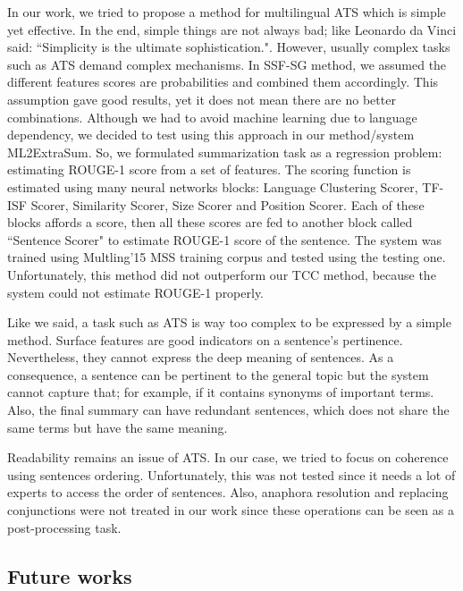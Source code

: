 \documentclass[12pt, oneside, a4paper]{article}
\begin{document}
In our work, we tried to propose a method for multilingual ATS which is simple yet effective.
In the end, simple things are not always bad;  like Leonardo da Vinci said: ``Simplicity is the ultimate sophistication.".
However, usually complex tasks such as ATS demand complex mechanisms. 
In SSF-SG method, we assumed the different features scores are probabilities and combined them accordingly.
This assumption gave good results, yet it does not mean there are no better combinations. 
Although we had to avoid machine learning due to language dependency, we decided to test using this approach in our method/system ML2ExtraSum. 
So, we formulated summarization task as a regression problem: estimating ROUGE-1 score from a set of features. 
The scoring function is estimated using many neural networks blocks: Language Clustering Scorer, TF-ISF Scorer, Similarity Scorer, Size Scorer and Position Scorer. 
Each of these blocks affords a score, then all these scores are fed to another block called ``Sentence Scorer" to estimate ROUGE-1 score of the sentence.
The system was trained using Multling'15 MSS training corpus and tested using the testing one. 
Unfortunately, this method did not outperform our TCC method, because the system could not estimate ROUGE-1 properly. 

Like we said, a task such as ATS is way too complex to be expressed by a simple method. 
Surface features are good indicators on a sentence's pertinence. 
Nevertheless, they cannot express the deep meaning of sentences. 
As a consequence, a sentence can be pertinent to the general topic but the system cannot capture that; for example, if it contains synonyms of important terms.
Also, the final summary can have redundant sentences, which does not share the same terms but have the same meaning.


Readability remains an issue of ATS. 
In our case, we tried to focus on coherence using sentences ordering. 
Unfortunately, this was not tested since it needs a lot of experts to access the order of sentences. 
Also, anaphora resolution and replacing conjunctions were not treated in our work since these operations can be seen as a post-processing task.


\subsection{Future works}
\end{document}
